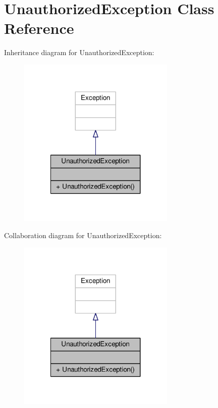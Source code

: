 \hypertarget{classUnauthorizedException}{\section{Unauthorized\-Exception Class Reference}
\label{classUnauthorizedException}
}


Inheritance diagram for Unauthorized\-Exception\-:
\nopagebreak
\begin{figure}[H]
\begin{center}
\leavevmode
\includegraphics[width=212pt]{classUnauthorizedException__inherit__graph}
\end{center}
\end{figure}


Collaboration diagram for Unauthorized\-Exception\-:
\nopagebreak
\begin{figure}[H]
\begin{center}
\leavevmode
\includegraphics[width=212pt]{classUnauthorizedException__coll__graph}
\end{center}
\end{figure}
